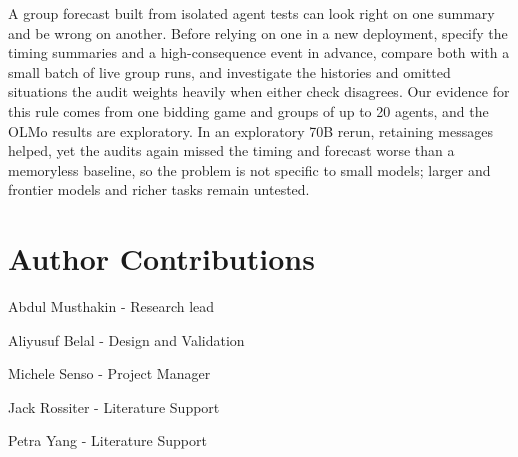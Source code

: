 \documentclass[11pt,letterpaper]{article}
\begin{document}
A group forecast built from isolated agent tests can look right on one summary and be wrong on another.
Before relying on one in a new deployment, specify the timing summaries and a high-consequence event in advance, compare both with a small batch of live group runs, and investigate the histories and omitted situations the audit weights heavily when either check disagrees.
Our evidence for this rule comes from one bidding game and groups of up to 20 agents, and the OLMo results are exploratory.
In an exploratory 70B rerun, retaining messages helped, yet the audits again missed the timing and forecast worse than a memoryless baseline, so the problem is not specific to small models; larger and frontier models and richer tasks remain untested.

\section{Author Contributions}

Abdul Musthakin - Research lead

Aliyusuf Belal - Design and Validation

Michele Senso - Project Manager

Jack Rossiter - Literature Support

Petra Yang - Literature Support
\end{document}

